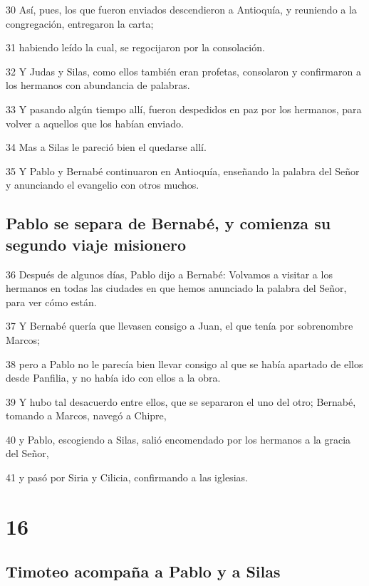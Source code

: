 \par 30 Así, pues, los que fueron enviados descendieron a Antioquía, y reuniendo a la congregación, entregaron la carta;
\par 31 habiendo leído la cual, se regocijaron por la consolación.
\par 32 Y Judas y Silas, como ellos también eran profetas, consolaron y confirmaron a los hermanos con abundancia de palabras.
\par 33 Y pasando algún tiempo allí, fueron despedidos en paz por los hermanos, para volver a aquellos que los habían enviado.
\par 34 Mas a Silas le pareció bien el quedarse allí.
\par 35 Y Pablo y Bernabé continuaron en Antioquía, enseñando la palabra del Señor y anunciando el evangelio con otros muchos.

\section*{Pablo se separa de Bernabé, y comienza su segundo viaje misionero}

\par 36 Después de algunos días, Pablo dijo a Bernabé: Volvamos a visitar a los hermanos en todas las ciudades en que hemos anunciado la palabra del Señor, para ver cómo están.
\par 37 Y Bernabé quería que llevasen consigo a Juan, el que tenía por sobrenombre Marcos;
\par 38 pero a Pablo no le parecía bien llevar consigo al que se había apartado de ellos desde Panfilia, y no había ido con ellos a la obra.
\par 39 Y hubo tal desacuerdo entre ellos, que se separaron el uno del otro; Bernabé, tomando a Marcos, navegó a Chipre,
\par 40 y Pablo, escogiendo a Silas, salió encomendado por los hermanos a la gracia del Señor,
\par 41 y pasó por Siria y Cilicia, confirmando a las iglesias.

\chapter{16}

\section*{Timoteo acompaña a Pablo y a Silas}

